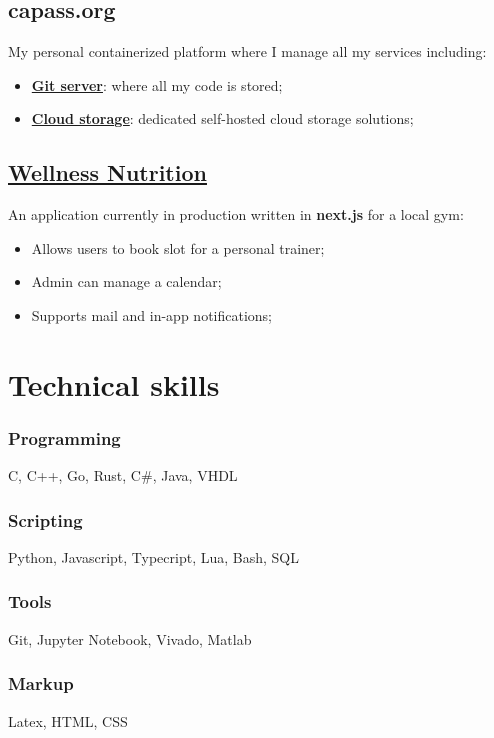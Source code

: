 \documentclass[10pt,a4paper]{article}
\begin{document}
  \subsection{capass.org}
  My personal containerized platform where I manage all my services including:
  \begin{itemize}
    \item \href{https://git.capass.org}{\textbf{Git server}}: where all my code is stored;
    \item \href{https://cloud.capass.org}{\textbf{Cloud storage}}: dedicated self-hosted cloud storage solutions;
  \end{itemize}

  \subsection{\href{https://wellnessdemo.capass.org}{Wellness Nutrition}}
  An application currently in production written in \textbf{next.js} for a local gym:
  \begin{itemize}
    \item Allows users to book slot for a personal trainer;
    \item Admin can manage a calendar;
    \item Supports mail and in-app notifications;
  \end{itemize}

  \section{Technical skills}
  \subsubsection{Programming}
  C, C++, Go, Rust, C\#, Java, VHDL

  \subsubsection{Scripting}
  Python, Javascript, Typecript, Lua, Bash, SQL

  \subsubsection{Tools}
  Git, Jupyter Notebook, Vivado, Matlab

  \subsubsection{Markup}
  Latex, HTML, CSS
\end{document}

